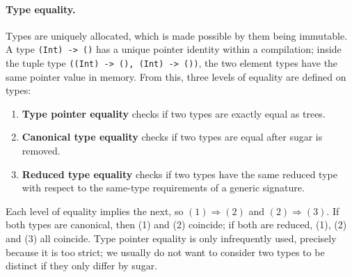 \documentclass[../generics]{subfiles}
\begin{document}
\paragraph{Type equality.} Types are uniquely allocated, which is made possible by them being immutable. A type \texttt{(Int) -> ()} has a unique pointer identity within a compilation; inside the tuple type \texttt{((Int) -> (), (Int) -> ())}, the two element types have the same pointer value in memory. From this, three levels of equality are defined on types:
\begin{enumerate}
\item {}\textbf{Type pointer equality} checks if two types are exactly equal as trees.
\item {}\textbf{Canonical type equality} checks if two types are equal after sugar is removed.
\item {}\textbf{Reduced type equality} checks if two types have the same reduced type with respect to the same-type requirements of a generic signature.
\end{enumerate}
Each level of equality implies the next, so $(1)\Rightarrow(2)$ and $(2)\Rightarrow(3)$. If both types are canonical, then (1) and (2) coincide; if both are reduced, (1), (2) and (3) all coincide. Type pointer equality is only infrequently used, precisely because it is too strict; we usually do not want to consider two types to be distinct if they only differ by sugar.
\end{document}
